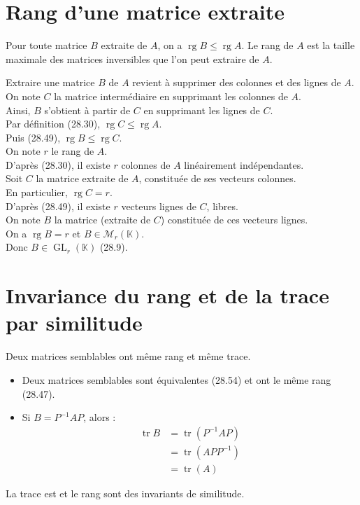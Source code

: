 \documentclass[../main.tex]{subfiles}
\begin{document}
\section{Rang d'une matrice extraite}
\begin{tcolorbox}[title=Propostion 28.52, title filled=false, colframe=lightblue, colback=lightblue!10!white]
    Pour toute matrice $B$ extraite de $A$, on a $\operatorname{rg} B \leq \operatorname{rg} A$. Le rang de $A$ est la taille maximale des matrices inversibles que l'on peut extraire de $A$. 
\end{tcolorbox}
\noindent Extraire une matrice $B$ de $A$ revient à supprimer des colonnes et des lignes de $A$. \\
On note $C$ la matrice intermédiaire en supprimant les colonnes de $A$. \\
Ainsi, $B$ s'obtient à partir de $C$ en supprimant les lignes de $C$. \\
Par définition (28.30), $\operatorname{rg} C \leq \operatorname{rg} A$. \\
Puis (28.49), $\operatorname{rg} B \leq \operatorname{rg} C$. \\
On note $r$ le rang de $A$. \\
D'après (28.30), il existe $r$ colonnes de $A$ linéairement indépendantes. \\
Soit $C$ la matrice extraite de $A$, constituée de ses vecteurs colonnes. \\
En particulier, $\operatorname{rg} C = r$. \\
D'après (28.49), il existe $r$ vecteurs lignes de $C$, libres. \\
On note $B$ la matrice (extraite de $C$) constituée de ces vecteurs lignes. \\
On a $\operatorname{rg} B = r$ et $B\in \mathcal{M}_r(\mathbb{K})$. \\
Donc $B\in \operatorname{GL}_r(\mathbb{K})$ (28.9). 

\section{Invariance du rang et de la trace par similitude}
\begin{tcolorbox}[title=Propostion 28.57, title filled=false, colframe=lightblue, colback=lightblue!10!white]
    Deux matrices semblables ont même rang et même trace. 
\end{tcolorbox}

\begin{itemize}
    \item Deux matrices semblables sont équivalentes (28.54) et ont le même rang (28.47). 
    \item Si $B = P^{-1}AP$, alors :
    \begin{align*}
        \operatorname{tr} B &= \operatorname{tr} (P^{-1}AP) \\
        &= \operatorname{tr} (APP^{-1}) \\
        &= \operatorname{tr} (A)
    \end{align*}
\end{itemize}
La trace est et le rang sont des invariants de similitude. 
\end{document}
